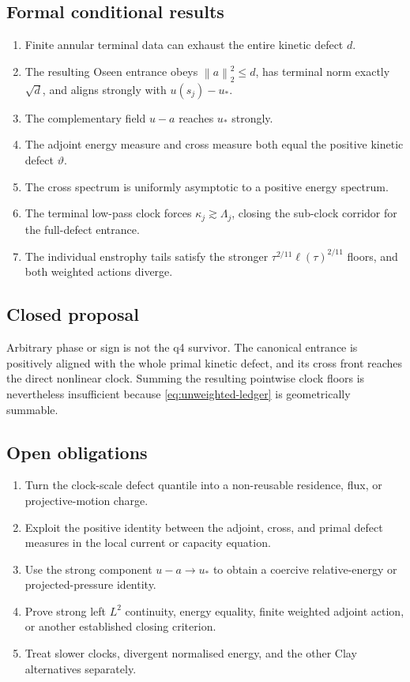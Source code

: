 \documentclass[11pt]{article}
\theoremstyle{remark}
\newcommand{\norm}[1]{\left\|#1\right\|}
\begin{document}
\subsection*{Formal conditional results}

\begin{enumerate}
\item Finite annular terminal data can exhaust the entire kinetic defect
      \(d\).
\item The resulting Oseen entrance obeys
      \(\norm a_2^2\leq d\), has terminal norm exactly \(\sqrt d\), and
      aligns strongly with \(u(s_j)-u_*\).
\item The complementary field \(u-a\) reaches \(u_*\) strongly.
\item The adjoint energy measure and cross measure both equal the
      positive kinetic defect \(\vartheta\).
\item The cross spectrum is uniformly asymptotic to a positive energy
      spectrum.
\item The terminal low-pass clock forces
      \(\kappa_j\gtrsim\Lambda_j\), closing the sub-clock corridor for
      the full-defect entrance.
\item The individual enstrophy tails satisfy the stronger
      \(\tau^{2/11}\ell(\tau)^{2/11}\) floors, and both weighted actions
      diverge.
\end{enumerate}

\subsection*{Closed proposal}

Arbitrary phase or sign is not the q4 survivor.  The canonical entrance
is positively aligned with the whole primal kinetic defect, and its
cross front reaches the direct nonlinear clock.  Summing the resulting
pointwise clock floors is nevertheless insufficient because
\eqref{eq:unweighted-ledger} is geometrically summable.

\subsection*{Open obligations}

\begin{enumerate}
\item Turn the clock-scale defect quantile into a non-reusable
      residence, flux, or projective-motion charge.
\item Exploit the positive identity between the adjoint, cross, and
      primal defect measures in the local current or capacity equation.
\item Use the strong component \(u-a\to u_*\) to obtain a coercive
      relative-energy or projected-pressure identity.
\item Prove strong left \(L^2\) continuity, energy equality, finite
      weighted adjoint action, or another established closing criterion.
\item Treat slower clocks, divergent normalised energy, and the other
      Clay alternatives separately.
\end{enumerate}
\end{document}
